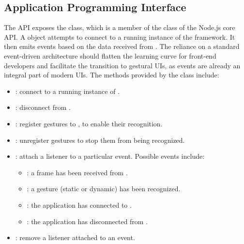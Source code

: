 \subsection{Application Programming Interface} \label{sec:quantumleap:description:api}

The \ql API exposes the  class, which is a member of the  class of the Node.js core API. A  object attempts to connect to a running instance of the \ql framework. It then emits events based on the data received from \ql. %
The reliance on a standard event-driven architecture should flatten the learning curve for front-end developers and facilitate the transition to gestural UIs, as events are already an integral part of modern UIs. The methods provided by the  class include:
\begin{itemize}[noitemsep]
    \item {}: connect to a running instance of \ql.
    \item {}: disconnect from \ql.
    \item {}: register gestures to \ql, to enable their recognition.
    \item {}: unregister gestures to stop them from being recognized.
    \item {}: attach a listener to a particular event. Possible events include:
    \begin{itemize}[noitemsep]
        \item {}: a frame has been received from \ql.
        \item {}: a gesture (static or dynamic) has been recognized.
        \item {}: the application has connected to \ql.
        \item {}: the application has disconnected from \ql.
    \end{itemize}
    \item {}: remove a listener attached to an event.
\end{itemize}

